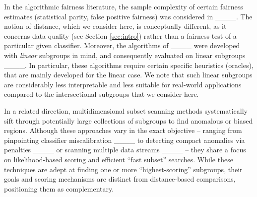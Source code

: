 In the algorithmic fairness literature,
the sample complexity of certain fairness estimates (statistical parity, false positive fairness) was considered in ____. The notion of distance, which we consider here, is conceptually different, as it concerns data quality (see Section \ref{sec:intro}) rather than a fairness test of a particular given classifier. Moreover,
the algorithms of ____ were developed with \emph{linear} subgroups in mind, and consequently evaluated on linear subgroups ____.
In particular, these algorithms require certain specific heuristics (oracles), that are mainly developed for the linear case.
We note that such linear subgroups are considerably less interpretable and less suitable for real-world applications compared to the intersectional subgroups that we consider here.


In a related direction, multidimensional subset scanning methods systematically sift through potentially large collections of subgroups to find anomalous or biased regions. Although these approaches vary in the exact objective -- ranging from pinpointing classifier miscalibration ____ to detecting compact anomalies via penalties ____ or scanning multiple data streams ____ -- they share a focus on likelihood-based scoring and efficient “fast subset” searches. While these techniques are adept at finding one or more ``highest-scoring'' subgroups, their goals and scoring mechanisms are distinct from distance-based comparisons, positioning them as complementary.


%